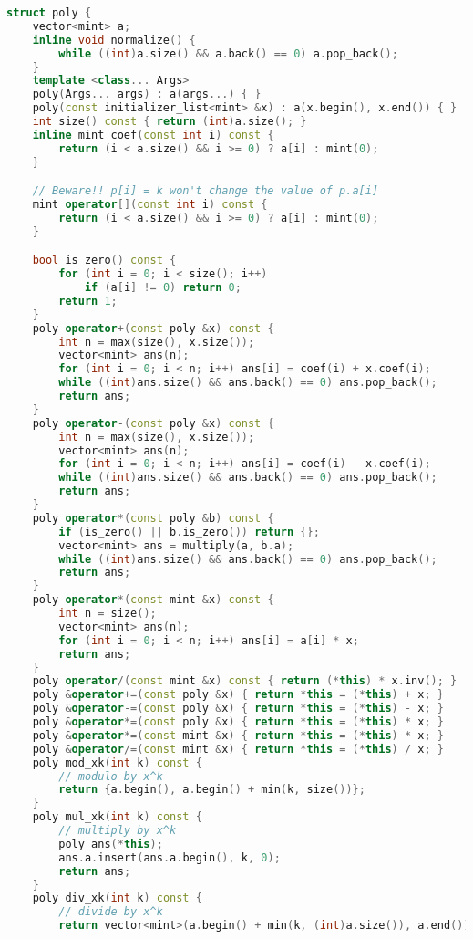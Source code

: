 \documentclass[10pt, a4paper, oneside]{book}
\begin{document}
\begin{lstlisting}[language=C++]
struct poly {
    vector<mint> a;
    inline void normalize() {
        while ((int)a.size() && a.back() == 0) a.pop_back();
    }
    template <class... Args>
    poly(Args... args) : a(args...) { }
    poly(const initializer_list<mint> &x) : a(x.begin(), x.end()) { }
    int size() const { return (int)a.size(); }
    inline mint coef(const int i) const {
        return (i < a.size() && i >= 0) ? a[i] : mint(0);
    }

    // Beware!! p[i] = k won't change the value of p.a[i]
    mint operator[](const int i) const {
        return (i < a.size() && i >= 0) ? a[i] : mint(0);
    }

    bool is_zero() const {
        for (int i = 0; i < size(); i++)
            if (a[i] != 0) return 0;
        return 1;
    }
    poly operator+(const poly &x) const {
        int n = max(size(), x.size());
        vector<mint> ans(n);
        for (int i = 0; i < n; i++) ans[i] = coef(i) + x.coef(i);
        while ((int)ans.size() && ans.back() == 0) ans.pop_back();
        return ans;
    }
    poly operator-(const poly &x) const {
        int n = max(size(), x.size());
        vector<mint> ans(n);
        for (int i = 0; i < n; i++) ans[i] = coef(i) - x.coef(i);
        while ((int)ans.size() && ans.back() == 0) ans.pop_back();
        return ans;
    }
    poly operator*(const poly &b) const {
        if (is_zero() || b.is_zero()) return {};
        vector<mint> ans = multiply(a, b.a);
        while ((int)ans.size() && ans.back() == 0) ans.pop_back();
        return ans;
    }
    poly operator*(const mint &x) const {
        int n = size();
        vector<mint> ans(n);
        for (int i = 0; i < n; i++) ans[i] = a[i] * x;
        return ans;
    }
    poly operator/(const mint &x) const { return (*this) * x.inv(); }
    poly &operator+=(const poly &x) { return *this = (*this) + x; }
    poly &operator-=(const poly &x) { return *this = (*this) - x; }
    poly &operator*=(const poly &x) { return *this = (*this) * x; }
    poly &operator*=(const mint &x) { return *this = (*this) * x; }
    poly &operator/=(const mint &x) { return *this = (*this) / x; }
    poly mod_xk(int k) const {
        // modulo by x^k
        return {a.begin(), a.begin() + min(k, size())};
    }
    poly mul_xk(int k) const {
        // multiply by x^k
        poly ans(*this);
        ans.a.insert(ans.a.begin(), k, 0);
        return ans;
    }
    poly div_xk(int k) const {
        // divide by x^k
        return vector<mint>(a.begin() + min(k, (int)a.size()), a.end());

\end{lstlisting}
\end{document}
